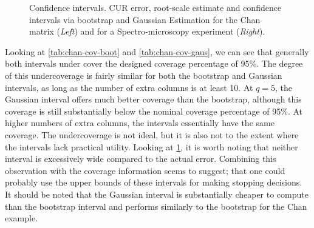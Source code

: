 \documentclass[11pt]{article}
\newenvironment{subfigure}[2][]{\begin{minipage}{#2}\refstepcounter{subfigure}\def\caption##1{\par\smallskip\centering\textbf{(\alph{subfigure})}~##1\par}}{\end{minipage}}
\begin{document}
\begin{figure}
\begin{subfigure}[b]{0.48\textwidth}
{
}
        \caption{Spectro-microscopy matrix.}
        \label{fig:bs-width}
    \end{subfigure}
    \caption{Confidence intervals. CUR error, root-scale estimate and confidence intervals via bootstrap and Gaussian Estimation for the Chan matrix (\textit{Left}) and for a Spectro-microscopy experiment (\textit{Right}).}
    \label{fig:bs-together}
\end{figure}
Looking at \cref{tab:chan-cov-boot} and \cref{tab:chan-cov-gaus}, we can see that generally both intervals under cover the designed coverage percentage of 95\%. The degree of this undercoverage is fairly similar for both the bootstrap and Gaussian intervals, as long as the number of extra columns is at least 10. At $q=5$, the Gaussian interval offers much better coverage than the bootstrap, although this coverage is still substantially below the nominal coverage percentage of 95\%. At higher numbers of extra columns, the intervals essentially have the same coverage. The undercoverage is not ideal, but it is also not to the extent where the intervals lack practical utility. 
Looking at \cref{fig:bs-together}, it is worth noting that neither interval is excessively wide compared to the actual error. Combining this observation with the coverage information seems to suggest; that one could probably use the upper bounds of these intervals for making stopping decisions. 
It should be noted that the Gaussian interval is substantially cheaper to compute than the bootstrap interval and performs similarly to the bootstrap for the Chan example. 
\end{document}
